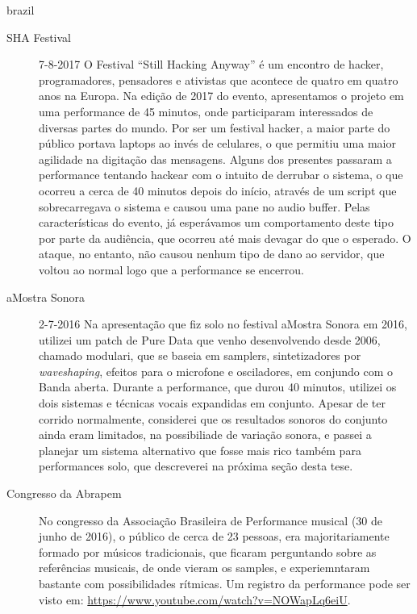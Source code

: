 \begin{otherlanguage*}{brazil}
\begin{description}
\item[SHA Festival] 7-8-2017
O Festival ``Still Hacking Anyway'' é um encontro de hacker, programadores, pensadores e ativistas que acontece de quatro em quatro anos na Europa. Na edição de 2017 do evento, apresentamos o projeto em uma performance de 45 minutos, onde participaram interessados de diversas partes do mundo. Por ser um festival hacker, a maior parte do público portava laptops ao invés de celulares, o que permitiu uma maior agilidade na digitação das mensagens. Alguns dos presentes passaram a performance tentando hackear com o intuito de derrubar o sistema, o que ocorreu a cerca de 40 minutos depois do início, através de um script que sobrecarregava o sistema e causou uma pane no audio buffer. Pelas características do evento, já esperávamos um comportamento deste tipo por parte da audiência, que ocorreu até mais devagar do que o esperado. O ataque, no entanto, não causou nenhum tipo de dano ao servidor, que voltou ao normal logo que a performance se encerrou.

\item[aMostra Sonora] 2-7-2016
Na apresentação que fiz solo no festival aMostra Sonora em 2016, utilizei um patch de Pure Data que venho desenvolvendo desde 2006, chamado modulari, que se baseia em samplers, sintetizadores por \emph{waveshaping}, efeitos para o microfone e osciladores, em conjundo com o Banda aberta. Durante a performance, que durou 40 minutos, utilizei os dois sistemas e técnicas vocais expandidas em conjunto. Apesar de ter corrido normalmente, considerei que os resultados sonoros do conjunto ainda eram limitados, na possibiliade de variação sonora, e passei a planejar um sistema alternativo que fosse mais rico também para performances solo, que descreverei na próxima seção desta tese.




\item[Congresso da Abrapem]

No congresso da Associação Brasileira de Performance musical (30 de junho de 2016), o público de cerca de 23 pessoas, era majoritariamente formado por músicos tradicionais, que ficaram perguntando sobre as referências musicais, de onde vieram os samples, e experiemntaram bastante com possibilidades rítmicas. Um registro da performance pode ser visto em:  \url{https://www.youtube.com/watch?v=NOWapLq6eiU}.




\end{description}
\end{otherlanguage*}
